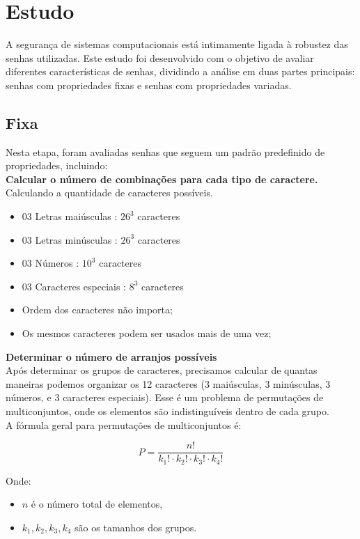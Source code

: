 \section{Estudo}

A segurança de sistemas computacionais está intimamente ligada à robustez das senhas utilizadas. Este estudo foi desenvolvido com o objetivo de avaliar diferentes características de senhas, dividindo a análise em duas partes principais: senhas com propriedades fixas e senhas com propriedades variadas.

\subsection{Fixa}

Nesta etapa, foram avaliadas senhas que seguem um padrão predefinido de propriedades, incluindo:\\

\textbf{Calcular o número de combinações para cada tipo de caractere.}\\
Calculando a quantidade de caracteres possíveis.
\begin{itemize}
	\item 03 Letras maiúsculas : $26^3$ caracteres
	\item 03 Letras minúsculas : $26^3$ caracteres
	\item 03 Números : $10^3$ caracteres
	\item 03 Caracteres especiais : $8^3$ caracteres
	\item Ordem dos caracteres não importa;
	\item Os mesmos caracteres podem ser usados mais de uma vez;
\end{itemize}

\textbf{Determinar o número de arranjos possíveis}\\
Após determinar os grupos de caracteres, precisamos calcular de quantas maneiras podemos organizar os 12 caracteres (3 maiúsculas, 3 minúsculas, 3 números, e 3 caracteres especiais). Esse é um problema de permutações de multiconjuntos, onde os elementos são indistinguíveis dentro de cada grupo.\\

A fórmula geral para permutações de multiconjuntos é:

\[
P = \frac{n!}{k_1! \cdot k_2! \cdot k_3! \cdot k_4!}
\]

Onde:
\begin{itemize}
    \item $n$ é o número total de elementos,
    \item $k_1, k_2, k_3, k_4$ são os tamanhos dos grupos.
\end{itemize}

